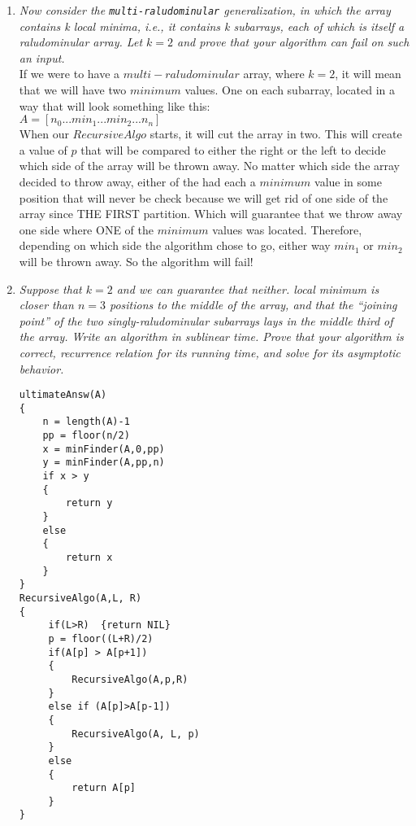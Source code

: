 \documentclass[12pt]{article} \setlength{\oddsidemargin}{0in}
\begin{document}
\begin{enumerate} [label=\textbf{\arabic*}.]
\begin{enumerate}  [label=\textbf{\alph*})]
    \textbf{Termination}. The $RecursiveAlgo$ will terminate under 2 circumstances. \\
    1$^{st}$ The function called itself the maximum number of times so it will return NIL.\\
2$^{nd}$ When the $minimum$ value is located before the function reaches its maximum times of recursion, which will return the correct $minimum$ value.\\
    
    
  \item \textit{Now consider the \texttt{multi-raludominular} %
      generalization, in which the array contains k local minima,
      i.e., it contains k subarrays, each of which is itself a
      raludominular array. Let $k = 2$ and prove that your algorithm
      can fail on such an input.}\\

    If we were to have a $multi-raludominular$ array, where $k=2$, it will mean that we will have two $minimum$ values. One on each subarray, located in a way that will look something like this:\\
    $A=[n_0 ... min_1 ... min_2 ... n_n]$\\
    When our $RecursiveAlgo$ starts, it will cut the array in two. This will create a value of $p$ that will be compared to either the right or the left to decide which side of the array will be thrown away. No matter which side the array decided to throw away, either of the had each a $minimum$ value in some position that will never be check because we will get rid of one side of the array since THE FIRST partition. Which will guarantee that we throw away one side where ONE of the $minimum$ values was located. Therefore, depending on which side the algorithm chose to go, either way $min_1$ or $min_2$ will be thrown away. So the algorithm will fail!\\
     
     \newpage
  \item \textit{Suppose that $k = 2$ and we can guarantee that neither. %
      local minimum is closer than $n=3$ positions to the middle of
      the array, and that the ``joining point'' of the two
      singly-raludominular subarrays lays in the middle third of the
      array.  Write an algorithm in sublinear time. Prove that your algorithm is correct, recurrence relation for its running time, and solve for
      its asymptotic behavior.}

      \begin{verbatim}
ultimateAnsw(A)
{
    n = length(A)-1
    pp = floor(n/2)
    x = minFinder(A,0,pp)
    y = minFinder(A,pp,n)
    if x > y
    {
        return y
    }
    else
    {
        return x
    }
}
RecursiveAlgo(A,L, R)
{
     if(L>R)  {return NIL}
     p = floor((L+R)/2)
     if(A[p] > A[p+1])
     {
         RecursiveAlgo(A,p,R)
     }
     else if (A[p]>A[p-1])
     {
         RecursiveAlgo(A, L, p)
     }
     else
     { 
         return A[p]
     }
}
    

\end{verbatim}
\end{enumerate}
\end{enumerate}
\end{document}
